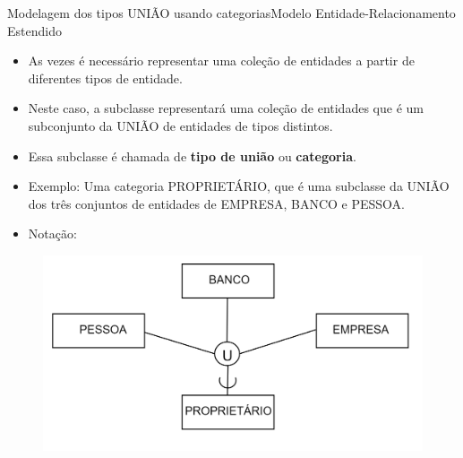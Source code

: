 \documentclass[t]{beamer}
\begin{document}

\begin{ftst}{Modelagem dos tipos UNIÃO usando categorias}{Modelo Entidade-Relacionamento Estendido}
\footnotesize
\begin{itemize}
    \item As vezes é necessário representar uma coleção de entidades a partir de diferentes tipos de entidade.
    \item Neste caso, a subclasse representará uma coleção de entidades que é um subconjunto da UNIÃO de entidades de tipos distintos. \item Essa subclasse é chamada de \textbf{tipo de união} ou \textbf{categoria}.
    \item Exemplo: Uma categoria PROPRIETÁRIO, que é uma subclasse da UNIÃO dos três conjuntos de entidades de EMPRESA, BANCO e PESSOA.
    \item Notação:
\end{itemize}
\begin{figure}
    \centering
    \includegraphics[scale=0.13]{Figuras/02_04.png}
\end{figure}
\end{ftst}

\end{document}
